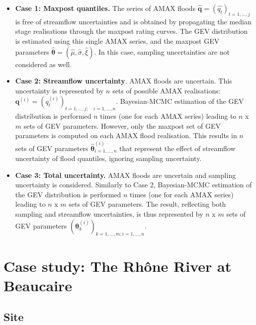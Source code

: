 \documentclass[11pt]{article}
\begin{document}
    \begin{itemize}
        \item \textbf{Case 1: Maxpost quantiles.} The series of AMAX floods $\mathbf{\hat{q}} = (\hat{q_t})_{t=1,...,j}$ is free of streamflow uncertainties and is obtained by propagating the median stage realisations through the maxpost rating curves. The GEV distribution is estimated using this single AMAX series, and the maxpost GEV parameters $\boldsymbol{\hat{\theta}} =  (\hat{\mu}, \hat{\sigma}, \hat{\xi})$. In this case, sampling uncertainties are not considered as well.
        
        \item \textbf{Case 2: Streamflow uncertainty}. AMAX floods are uncertain. This uncertainty is represented by $n$ sets of possible AMAX realisations: $\mathbf{q}^{(i)} = (q_t^{(i)})_{t=1,...,j;\quad i=1,...,n}$. Bayesian-MCMC estimation of the GEV distribution is performed $n$ times (one for each AMAX series) leading to $n$ x $m$ sets of GEV parameters. However, only the maxpost set of GEV parameters is computed on each AMAX flood realisation. This results in $n$ sets of GEV parameters $\boldsymbol{\hat{\theta}}^{(i)}_{i=1,...,n}$ that represent the effect of streamflow uncertainty of flood quantiles, ignoring sampling uncertainty.
    
        \item \textbf{Case 3: Total uncertainty.} AMAX floods are uncertain and sampling uncertainty is considered. Similarly to Case 2, Bayesian-MCMC estimation of the GEV distribution is performed $n$ times (one for each AMAX series) leading to $n$ x $m$ sets of GEV parameters. The result, reflecting both sampling and streamflow uncertainties, is thus represented by $n$ x $m$ sets of GEV parameters $(\boldsymbol{\theta}^{(i)}_k)_{k=1,...,m ; i=1,...,n}$.
    \end{itemize}
    
\section{Case study: The Rhône River at Beaucaire}

    \subsection{Site}
    
\end{document}
